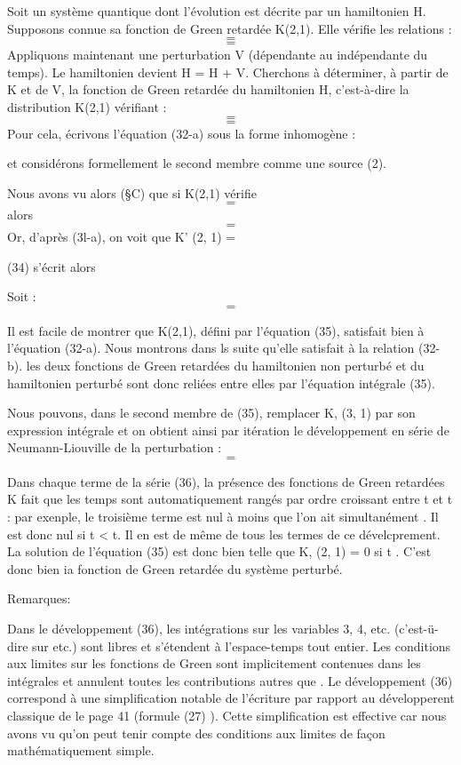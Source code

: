 Soit un système quantique dont l'évolution est décrite par un
hamiltonien H. Supposons connue sa fonction de Green retardée K(2,1).
Elle vérifie les relations :
\[
\tag{31-a}=
\]
\[
\tag{31-b}=
\]
Appliquons maintenant une perturbation V (dépendante au indépendante du
temps). Le hamiltonien devient H = H + V. Cherchons à déterminer, à partir
de K et de V, la fonction de Green retardée du hamiltonien H, c'est-à-dire
la distribution K(2,1) vérifiant :
\[
\tag{32-a}=
\]
\[
\tag{32-b}=
\]
Pour cela, écrivons l'équation (32-a) sous la forme inhomogène :

et considérons formellement le second membre comme une source  (2).


Nous avons vu alors (\S C) que si K(2,1) vérifie
\[
\tag{33}=
\]
alors
\[
\tag{34}=
\]
Or, d'après (3l-a), on voit que K' (2, 1) =

(34) s'écrit alors

Soit :
\[
\tag{35}=
\]

Il est facile de montrer que K(2,1), défini par l'équation (35),
satisfait bien à l'équation (32-a). Nous montrons dans ls suite qu'elle
satisfait à la relation (32-b). les deux fonctions de Green retardées
du hamiltonien non perturbé et du hamiltonien perturbé sont donc reliées
entre elles par l'équation intégrale (35).

Nous pouvons, dans le second membre de (35), remplacer K, (3, 1)
par son expression intégrale et on obtient ainsi par itération le développement
en série de Neumann-Liouville de la perturbation :
\[
\tag{36}=
\]

Dans chaque terme de la série (36), la présence des fonctions de
Green retardées K fait que les temps sont automatiquement rangés par
ordre croissant entre t et t : par exenple, le troisième terme est nul
à moins que l'on ait simultanément . Il est donc
nul si t < t. Il en est de même de tous les termes de ce dévelcprement.
La solution de l'équation (35) est donc bien telle que K, (2, 1) = 0 si
t . C'est donc bien ia fonction de Green retardée du système perturbé.

Remarques:

Dans le développement (36), les intégrations sur les variables 3, 4, etc.
(c'est-ü-dire sur etc.) sont libres et s'étendent à l'espace-temps tout entier.
Les conditions aux limites sur les fonctions de Green
sont implicitement contenues dans les intégrales et annulent toutes les contributions
autres que . Le développement (36) correspond
à une simplification notable de l'écriture par rapport au développerent
classique de le page 41 (formule (27) ). Cette simplification est effective
car nous avons vu qu'on peut tenir compte des conditions aux limites de façon
mathématiquement simple.
